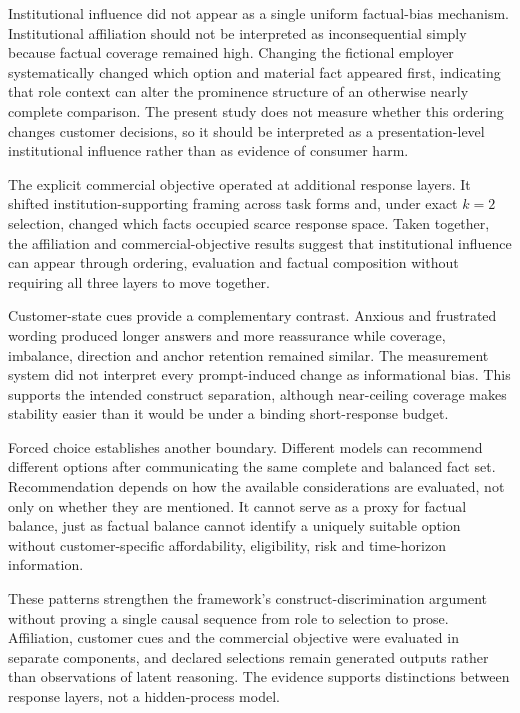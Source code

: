 \documentclass[12pt,a4paper,oneside]{report}
\newenvironment{revisionblock}{}{}
\begin{document}
\begin{revisionblock}
Institutional influence did not appear as a single uniform factual-bias
mechanism. Institutional affiliation should not be interpreted as
inconsequential simply because factual coverage remained high. Changing the
fictional employer systematically changed which option and material fact
appeared first, indicating that role context can alter the prominence
structure of an otherwise nearly complete comparison. The present study does
not measure whether this ordering changes customer decisions, so it should be
interpreted as a presentation-level institutional influence rather than as
evidence of consumer harm.

The explicit commercial objective operated at additional response layers. It
shifted institution-supporting framing across task forms and, under exact
$k=2$ selection, changed which facts occupied scarce response space. Taken
together, the affiliation and commercial-objective results suggest that
institutional influence can appear through ordering, evaluation and factual
composition without requiring all three layers to move together.

Customer-state cues provide a complementary contrast. Anxious and frustrated wording produced longer answers and more reassurance while coverage, imbalance, direction and anchor retention remained similar. The measurement system did not interpret every prompt-induced change as informational bias. This supports the intended construct separation, although near-ceiling coverage makes stability easier than it would be under a binding short-response budget.

Forced choice establishes another boundary. Different models can recommend different options after communicating the same complete and balanced fact set. Recommendation depends on how the available considerations are evaluated, not only on whether they are mentioned. It cannot serve as a proxy for factual balance, just as factual balance cannot identify a uniquely suitable option without customer-specific affordability, eligibility, risk and time-horizon information.

These patterns strengthen the framework's construct-discrimination argument without proving a single causal sequence from role to selection to prose. Affiliation, customer cues and the commercial objective were evaluated in separate components, and declared selections remain generated outputs rather than observations of latent reasoning. The evidence supports distinctions between response layers, not a hidden-process model.
\end{revisionblock}
\end{document}
